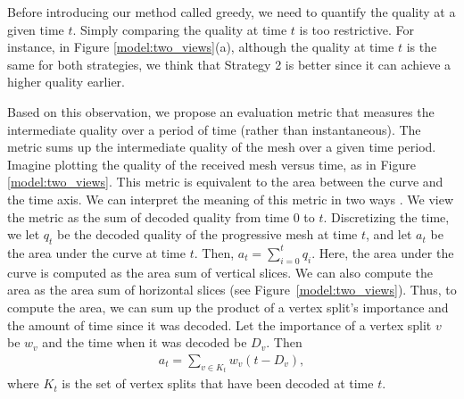     Before introducing our method called greedy, 
    we need to quantify the quality at 
    a given time $t$. 
    Simply comparing the %
    quality at time $t$ 
    is too restrictive.
    For instance, in Figure
    \ref{model:two_views}(a), although the quality at time $t$ is
    the same for both strategies, we think that Strategy 2 is
    better since it can achieve a higher quality earlier.

    Based on this observation, we propose an evaluation
    metric that measures the intermediate quality over a
    period of time (rather than instantaneous).  The metric
    sums up the intermediate quality of the mesh over a
    given time period.  Imagine plotting the quality of the
    received mesh versus time, as in Figure
    \ref{model:two_views}.  This metric is equivalent to the
    area between the curve and the time axis.  We can interpret
    the meaning of this metric in two
    ways .  We view
    the metric as the sum of decoded quality from time $0$ to
    $t$.  Discretizing the time, we let $q_t$ be the decoded
    quality of the progressive mesh at time $t$, and let
    $a_t$ be the area under the curve at time $t$.  Then,
    $a_t = \sum_{i=0}^t q_i$.  Here, the area under the curve
    is computed as the area sum of vertical slices.
    We can also compute the area as the area sum of
    horizontal slices (see Figure~\ref{model:two_views}).  Thus,
    to compute the area, we can sum up the product of a
    vertex split's importance and the amount of time since
    it was decoded.
    Let the importance of a vertex split $v$ be $w_v$ and the time when
    it was decoded be $D_v$.  Then
    \begin{eqnarray}\label{e:model:quality}
    a_t = \sum_{v \in K_t} w_v (t - D_v),
    \end{eqnarray}
    where $K_t$ is the set of vertex splits that
    have been decoded at time $t$.

